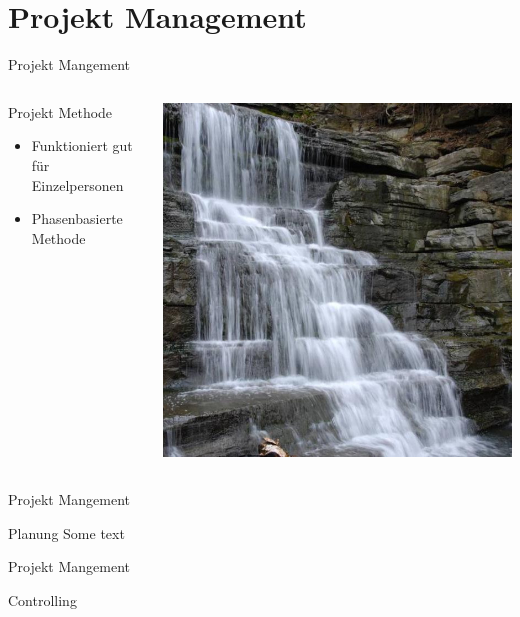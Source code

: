\documentclass[aspectratio=1610]{beamer}
\begin{document}
\section{Projekt Management}
\label{sec:orgb0802f8}
\begin{frame}[label={sec:org89ce744}]{Projekt Mangement}
\begin{columns}
\begin{column}{0.5\columnwidth}
\alert{Projekt Methode}
\begin{itemize}
\item <2-> Funktioniert gut für Einzelpersonen
\item <3-> Phasenbasierte Methode
\end{itemize}
\end{column}

\begin{column}{0.5\columnwidth}
\begin{center}
\includegraphics[width=.8\linewidth]{pictures/waterfall_stairs.jpg}
\end{center}
\end{column}
\end{columns}
\end{frame}

\begin{frame}[label={sec:orgc76b159}]{Projekt Mangement}
\begin{block}{Planung}
Some text
\end{block}
\end{frame}

\begin{frame}[label={sec:orgc50b7de}]{Projekt Mangement}
\begin{block}{Controlling}
\end{block}
\end{frame}
\end{document}
